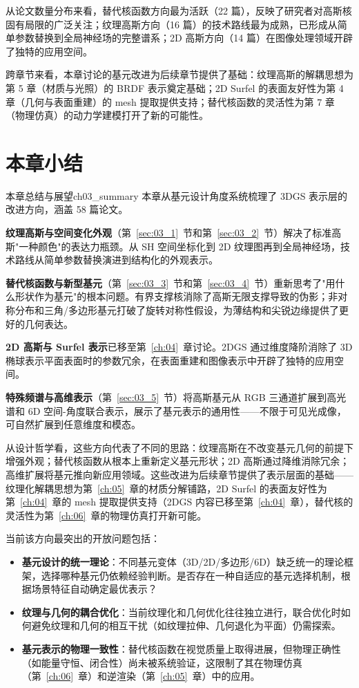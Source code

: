 从论文数量分布来看，替代核函数方向最为活跃（22 篇），反映了研究者对高斯核固有局限的广泛关注；纹理高斯方向（16 篇）的技术路线最为成熟，已形成从简单参数替换到全局神经场的完整谱系；2D 高斯方向（14 篇）在图像处理领域开辟了独特的应用空间。

跨章节来看，本章讨论的基元改进为后续章节提供了基础：纹理高斯的解耦思想为第 5 章（材质与光照）的 BRDF 表示奠定基础；2D Surfel 的表面友好性为第 4 章（几何与表面重建）的 mesh 提取提供支持；替代核函数的灵活性为第 7 章（物理仿真）的动力学建模打开了新的可能性。



\section*{本章小结}

\begin{futurebox}{本章总结与展望}{ch03_summary}
本章从基元设计角度系统梳理了 3DGS 表示层的改进方向，涵盖 58 篇论文。

\textbf{纹理高斯与空间变化外观}（第~\ref{sec:03_1}~节和第~\ref{sec:03_2}~节）解决了标准高斯"一种颜色"的表达力瓶颈。从 SH 空间坐标化到 2D 纹理图再到全局神经场，技术路线从简单参数替换演进到结构化的外观表示。

\textbf{替代核函数与新型基元}（第~\ref{sec:03_3}~节和第~\ref{sec:03_4}~节）重新思考了"用什么形状作为基元"的根本问题。有界支撑核消除了高斯无限支撑导致的伪影；非对称分布和三角/多边形基元打破了旋转对称性假设，为薄结构和尖锐边缘提供了更好的几何表达。

\textbf{2D 高斯与 Surfel 表示}已移至第~\ref{ch:04}~章讨论。2DGS 通过维度降阶消除了 3D 椭球表示平面表面时的参数冗余，在表面重建和图像表示中开辟了独特的应用空间。

\textbf{特殊频谱与高维表示}（第~\ref{sec:03_5}~节）将高斯基元从 RGB 三通道扩展到高光谱和 6D 空间-角度联合表示，展示了基元表示的通用性——不限于可见光成像，可自然扩展到任意维度和模态。

从设计哲学看，这些方向代表了不同的思路：纹理高斯在不改变基元几何的前提下增强外观；替代核函数从根本上重新定义基元形状；2D 高斯通过降维消除冗余；高维扩展将基元推向新应用领域。这些改进为后续章节提供了表示层面的基础——纹理化解耦思想为第~\ref{ch:05}~章的材质分解铺路，2D Surfel 的表面友好性为第~\ref{ch:04}~章的 mesh 提取提供支持（2DGS 内容已移至第~\ref{ch:04}~章），替代核的灵活性为第~\ref{ch:06}~章的物理仿真打开新可能。

当前该方向最突出的开放问题包括：
\begin{itemize}
\item \textbf{基元设计的统一理论}：不同基元变体（3D/2D/多边形/6D）缺乏统一的理论框架，选择哪种基元仍依赖经验判断。是否存在一种自适应的基元选择机制，根据场景特征自动确定最优表示？
\item \textbf{纹理与几何的耦合优化}：当前纹理化和几何优化往往独立进行，联合优化时如何避免纹理和几何的相互干扰（如纹理拉伸、几何退化为平面）仍需探索。
\item \textbf{基元表示的物理一致性}：替代核函数在视觉质量上取得进展，但物理正确性（如能量守恒、闭合性）尚未被系统验证，这限制了其在物理仿真（第~\ref{ch:06}~章）和逆渲染（第~\ref{ch:05}~章）中的应用。
\end{itemize}
\end{futurebox}
